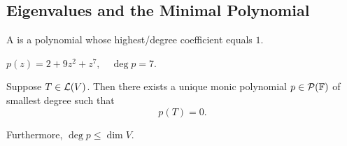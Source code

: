 \subsection{Eigenvalues and the Minimal Polynomial}

\begin{mydef} 
  A  is a polynomial whose highest\-/degree coefficient equals $1$.
\end{mydef}
\begin{example}
  $p(z)=2+9z^2+z^7, \quad \deg p = 7$.
\end{example}

\begin{thm}
  \label{thm: unique monic polynomial of smallest degree}
  Suppose $T\in \mathcal{L}(V)$. Then there exists a unique monic polynomial $p\in \mathcal{P}(\mathbb{F})$ of smallest degree such that
  \begin{equation}
    p(T)=0.
  \end{equation}

  Furthermore, $\deg p \leq \dim V$.
\end{thm}
